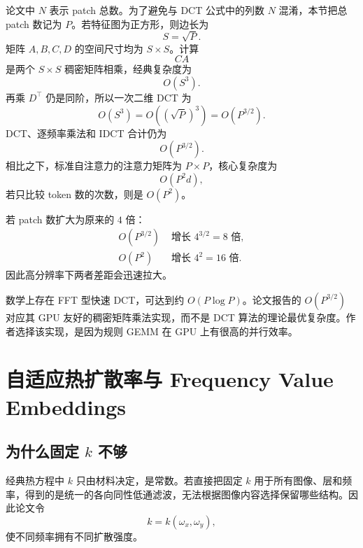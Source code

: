 \documentclass[UTF8,12pt,a4paper,fontset=none]{ctexart}
\numberwithin{equation}{section}
\begin{document}
论文中 $N$ 表示 patch 总数。为了避免与 DCT 公式中的列数 $N$ 混淆，本节把总 patch 数记为 $P$。若特征图为正方形，则边长为
\begin{equation}
  S=\sqrt{P}.
\end{equation}
矩阵 $A,B,C,D$ 的空间尺寸均为 $S\times S$。计算
\begin{equation}
  CA
\end{equation}
是两个 $S\times S$ 稠密矩阵相乘，经典复杂度为
\begin{equation}
  O(S^3).
\end{equation}
再乘 $D^{\top}$ 仍是同阶，所以一次二维 DCT 为
\begin{equation}
  O(S^3)=O\left((\sqrt{P})^3\right)=O(P^{3/2}).
\end{equation}
DCT、逐频率乘法和 IDCT 合计仍为
\begin{equation}
  \boxed{O(P^{3/2})}.
\end{equation}
相比之下，标准自注意力的注意力矩阵为 $P\times P$，核心复杂度为
\begin{equation}
  O(P^2d),
\end{equation}
若只比较 token 数的次数，则是 $O(P^2)$。

\begin{examplebox}[分辨率升高时的增长差异]
若 patch 数扩大为原来的 $4$ 倍：
\begin{align}
  O(P^{3/2})&\text{ 增长 }4^{3/2}=8\text{ 倍},\\
  O(P^2)&\text{ 增长 }4^2=16\text{ 倍}.
\end{align}
因此高分辨率下两者差距会迅速拉大。
\end{examplebox}

\begin{notebox}[复杂度表述需要精确理解]
数学上存在 FFT 型快速 DCT，可达到约 $O(P\log P)$。论文报告的 $O(P^{3/2})$ 对应其 GPU 友好的稠密矩阵乘法实现，而不是 DCT 算法的理论最优复杂度。作者选择该实现，是因为规则 GEMM 在 GPU 上有很高的并行效率。
\end{notebox}

\section{自适应热扩散率与 Frequency Value Embeddings}

\subsection{为什么固定 \texorpdfstring{$k$}{k} 不够}

经典热方程中 $k$ 只由材料决定，是常数。若直接把固定 $k$ 用于所有图像、层和频率，得到的是统一的各向同性低通滤波，无法根据图像内容选择保留哪些结构。因此论文令
\begin{equation}
  k=k(\omega_x,\omega_y),
\end{equation}
使不同频率拥有不同扩散强度。
\end{document}
